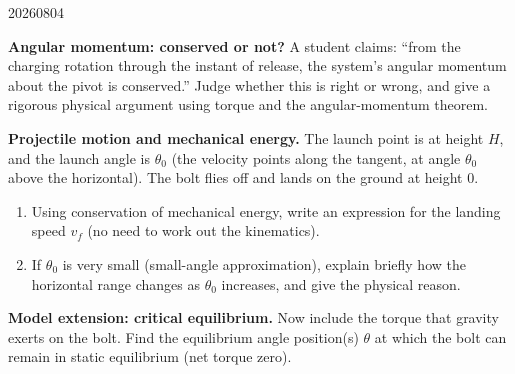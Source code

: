 \begin{problem}{20260804}
\begin{questions}
  \item \textbf{Angular momentum: conserved or not?}
        A student claims: ``from the charging rotation through the instant of release, the system's angular momentum about the pivot is conserved.''  Judge whether this is right or wrong, and give a rigorous physical argument using torque and the angular-momentum theorem.

  \item \textbf{Projectile motion and mechanical energy.}
        The launch point is at height $H$, and the launch angle is $\theta_{0}$ (the velocity points along the tangent, at angle $\theta_{0}$ above the horizontal).  The bolt flies off and lands on the ground at height $0$.
        \begin{enumerate}[label=\roman*.]
          \item Using conservation of mechanical energy, write an expression for the landing speed $v_f$ (no need to work out the kinematics).
          \item If $\theta_{0}$ is very small (small-angle approximation), explain briefly how the horizontal range changes as $\theta_{0}$ increases, and give the physical reason.
        \end{enumerate}

  \item \textbf{Model extension: critical equilibrium.}
        Now include the torque that gravity exerts on the bolt.  Find the equilibrium angle position(s) $\theta$ at which the bolt can remain in static equilibrium (net torque zero).
\end{questions}

\end{problem}


